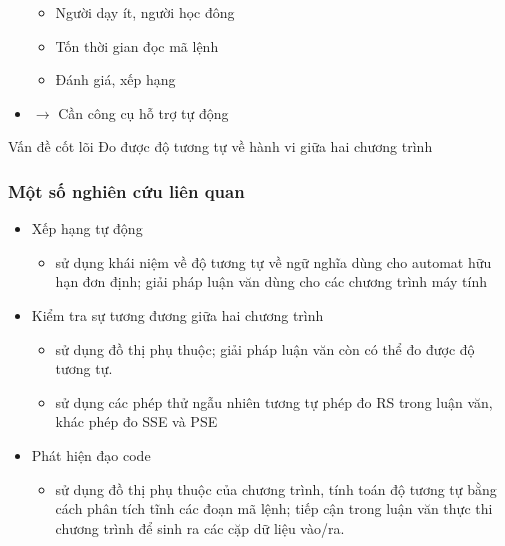 \documentclass{beamer}
\begin{document}
\begin{frame}
\begin{minipage}{0.59\linewidth}
\begin{itemize}
      \begin{itemize}
      \item Người dạy ít, người học đông
      \item Tốn thời gian đọc mã lệnh
      \item Đánh giá, xếp hạng
      \end{itemize} \pause
    \item $\rightarrow$ Cần công cụ hỗ trợ tự động
    \end{itemize} \pause
  \end{minipage}
  \begin{block}{Vấn đề cốt lõi}
    Đo được độ tương tự về hành vi giữa hai chương trình
  \end{block}
\end{frame}

\begin{frame}
  \frametitle{Một số nghiên cứu liên quan}
  \begin{itemize}
  \item Xếp hạng tự động
    \begin{itemize}
    \item \cite{alur2013automated} sử dụng khái niệm về độ tương tự về
      ngữ nghĩa dùng cho automat hữu hạn đơn định; giải pháp luận văn
      dùng cho các chương trình máy tính
    \end{itemize}
  \item Kiểm tra sự tương đương giữa hai chương trình
    \begin{itemize}
    \item \cite{bates1993incremental} sử dụng đồ thị phụ thuộc; giải
      pháp luận văn còn có thể đo được độ tương tự.
    \item \cite{jiang2009automatic} sử dụng các phép thử ngẫu nhiên
      tương tự phép đo RS trong luận văn, khác phép đo SSE và PSE
    \end{itemize}
  \item Phát hiện đạo code
    \begin{itemize}
    \item \cite{komondoor2001using} sử dụng đồ thị phụ thuộc của
      chương trình, tính toán độ tương tự bằng cách phân tích tĩnh các
      đoạn mã lệnh; tiếp cận trong luận văn thực thi chương trình để
      sinh ra các cặp dữ liệu vào/ra.
    \end{itemize}
  \end{itemize}

\end{frame}
\end{document}

